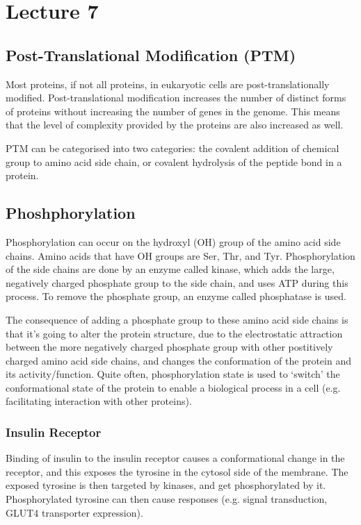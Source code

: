 \documentclass[a4paper, 12pt]{report}
\newcommand{\mychapter}[2]{
    \setcounter{chapter}{#1}
    \setcounter{section}{0}
    \chapter*{#2}
    \addcontentsline{toc}{chapter}{#2}
}
\begin{document}
\mychapter{7}{Lecture 7}

\section{Post-Translational Modification (PTM)}

Most proteins, if not all proteins, in eukaryotic cells are post-translationally modified.
Post-translational modification increases the number of distinct forms of proteins without increasing the number of genes in the genome.
This means that the level of complexity provided by the proteins are also increased as well.

PTM can be categorised into two categories: the covalent addition of chemical group to amino acid side chain, or covalent hydrolysis of the peptide bond in a protein.

\section{Phoshphorylation}

Phosphorylation can occur on the hydroxyl (OH) group of the amino acid side chains.
Amino acids that have OH groups are Ser, Thr, and Tyr.
Phosphorylation of the side chains are done by an enzyme called kinase, which adds the large, negatively charged phosphate group to the side chain, and uses ATP during this process.
To remove the phosphate group, an enzyme called phosphatase is used.

The consequence of adding a phosphate group to these amino acid side chains is that it's going to alter the protein structure, due to the electrostatic attraction between the more negatively charged phosphate group with other postitively charged amino acid side chains, and changes the conformation of the protein and its activity/function.
Quite often, phosphorylation state is used to `switch' the conformational state of the protein to enable a biological process in a cell (e.g. facilitating interaction with other proteins).

\subsection{Insulin Receptor}

Binding of insulin to the insulin receptor causes a conformational change in the receptor, and this exposes the tyrosine in the cytosol side of the membrane.
The exposed tyrosine is then targeted by kinases, and get phosphorylated by it.
Phosphorylated tyrosine can then cause responses (e.g. signal transduction, GLUT4 transporter expression).
\end{document}
